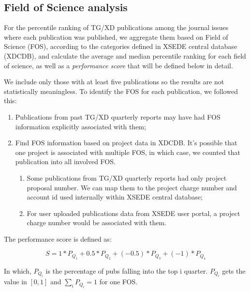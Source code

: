 \documentclass{sig-alternate}
\begin{document}
\subsection{Field of Science analysis}


For the percentile ranking of TG/XD publications among the journal
issues where each publication was published, we aggregate them based
on Field of Science (FOS), according to the categories defined in
XSEDE central database (XDCDB), and calculate the average and median
percentile ranking for each field of science, as well as a
\emph{performance score} that will be defined below in detail.

We include only those with at least five publications so the results
are not statistically meaningless. To identify the FOS for each
publication, we followed this:

\begin{enumerate}

\item Publications from past TG/XD quarterly reports may have had
  FOS information explicitly associated with them;

\item Find FOS information based on project data in XDCDB. It's
  possible that one project is associated with multiple FOS, in which
  case, we counted that publication into all involved FOS.

\begin{enumerate}

\item Some publications from TG/XD quarterly reports had only project
  proposal number. We can map them to the project charge number and
  account id used internally within XSEDE central database;

\item For user uploaded publications data from XSEDE user portal, a
  project charge number would be associated with them.

\end{enumerate}

\end{enumerate}

The performance score is defined as:

\[	S = 1*P_{Q_1} + 0.5*P_{Q_2}+ (-0.5)*P_{Q_3} + (-1)*P_{Q_4} \]

In which, $P_{Q_i}$ is the percentage of pubs falling into the top i
quarter. $P_{Q_i}$ gets the value in $[0,1]$ and
$\sum_{i} {P_{Q_i}} = 1$ for one FOS.
\end{document}
